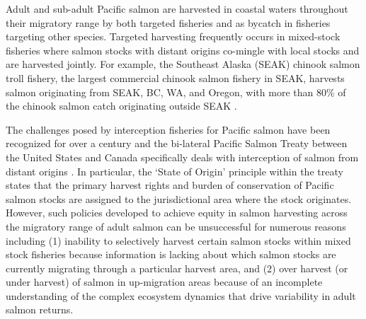 Adult and sub-adult Pacific salmon are harvested in coastal waters throughout
their migratory range by both targeted fisheries and as bycatch in fisheries
targeting other species. Targeted harvesting frequently occurs in mixed-stock
fisheries where salmon stocks with distant origins co-mingle with local stocks
and are harvested jointly. For example, the Southeast Alaska (SEAK) chinook
salmon troll fishery, the largest commercial chinook salmon fishery in SEAK,
harvests salmon originating from SEAK, BC, WA, and Oregon, with more
than 80\% of the chinook salmon catch originating outside SEAK
\citep{Templin2004}.

The challenges posed by interception fisheries for Pacific salmon have been
recognized for over a century and the bi-lateral Pacific Salmon Treaty between
the United States and Canada specifically deals with interception of salmon from
distant origins \citep{Knight2000, Noakes2005b}. In particular, the `State of
Origin' principle within the treaty states that the primary harvest rights and
burden of conservation of Pacific salmon stocks are assigned to the
jurisdictional area where the stock originates. However, such policies developed
to achieve equity in salmon harvesting across the migratory range of adult
salmon can be unsuccessful for numerous reasons including (1) inability to
selectively harvest certain salmon stocks within mixed stock fisheries because
information is lacking about which salmon stocks are currently migrating through
a particular harvest area, and (2) over harvest (or under harvest) of salmon in
up-migration areas because of an incomplete understanding of the complex
ecosystem dynamics that drive variability in adult salmon returns.

